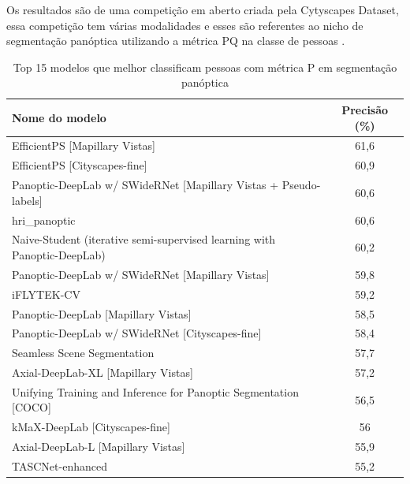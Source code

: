 Os resultados são de uma competição em aberto criada pela Cytyscapes Dataset, essa competição tem várias modalidades e esses são referentes ao nicho de segmentação panóptica utilizando a métrica PQ na classe de pessoas \cite{datasetResults}.
\begin{table}[H]
	\centering
	\caption{Top 15 modelos que melhor classificam pessoas com métrica P em segmentação panóptica}
	\label{tab:resultados-cityscapes}
	\begin{tabular}{|l|c|}
	  \hline
	  Nome do modelo & Precisão (\%) \\
	  \hline
	  EfficientPS [Mapillary Vistas] & 61,6 \\
	  EfficientPS [Cityscapes-fine] & 60,9 \\
	  Panoptic-DeepLab w/ SWideRNet [Mapillary Vistas + Pseudo-labels] & 60,6 \\
	  hri\_panoptic & 60,6 \\
	  Naive-Student (iterative semi-supervised learning with Panoptic-DeepLab) & 60,2 \\
	  Panoptic-DeepLab w/ SWideRNet [Mapillary Vistas] & 59,8 \\
	  iFLYTEK-CV & 59,2 \\
	  Panoptic-DeepLab [Mapillary Vistas] & 58,5 \\
	  Panoptic-DeepLab w/ SWideRNet [Cityscapes-fine] & 58,4 \\
	  Seamless Scene Segmentation & 57,7 \\
	  Axial-DeepLab-XL [Mapillary Vistas] & 57,2 \\
	  Unifying Training and Inference for Panoptic Segmentation [COCO] & 56,5 \\
	  kMaX-DeepLab [Cityscapes-fine] & 56 \\
	  Axial-DeepLab-L [Mapillary Vistas] & 55,9 \\
	  TASCNet-enhanced & 55,2 \\
	  \hline
	\end{tabular}
  \end{table}
  
  

